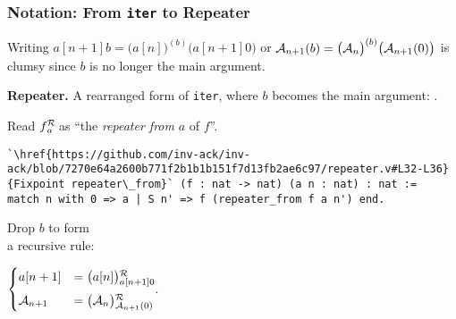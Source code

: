 \begin{frame}[fragile]
\frametitle{Notation: From \texttt{iter} to Repeater}
%
%
%

Writing $a[n+1]b = \big(a[n]\big)^{(b)}\big(a[n+1]0\big)$ or $\mathcal{A}_{n+1}(b) = \big(\mathcal{A}_n\big)^{(b)}\big(\mathcal{A}_{n+1}(0)\big)$ is clumsy since $b$ is no longer the main argument.

\bigskip

\textbf{Repeater.} A rearranged form of \texttt{iter}, where $b$ becomes the main argument:
.

\smallskip

Read $\rf{f}{a}$ as ``the \emph{repeater from} $a$ of $f$''.

\smallskip


\begin{lstlisting}
`\href{https://github.com/inv-ack/inv-ack/blob/7270e64a2600b771f2b1b1b151f7d13fb2ae6c97/repeater.v#L32-L36}{Fixpoint repeater\_from}` (f : nat -> nat) (a n : nat) : nat :=
match n with 0 => a | S n' => f (repeater_from f a n') end.
\end{lstlisting}

\smallskip

\begin{minipage}{0.25\linewidth}
	Drop $b$ to form \\ a recursive rule:
\end{minipage}
\quad 
$\begin{cases}
\displaystyle a[n+1] & = \rf{\big(a[n]\big)}{a[n+1]0} \\[5pt]
\Ack_{n+1} & = \rf{\big(\Ack_n\big)}{\Ack_{n+1}(0)}
\end{cases}$.

\end{frame}


